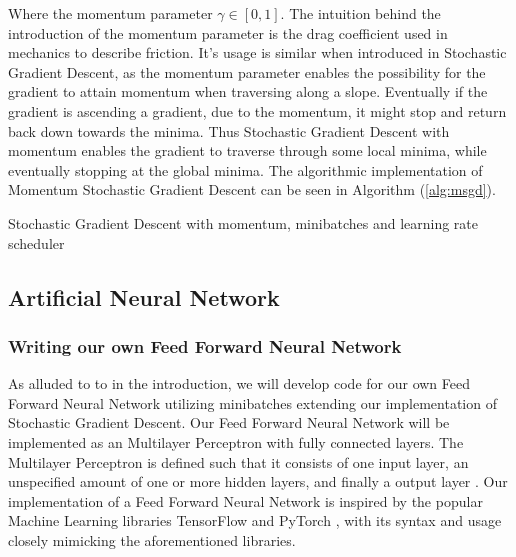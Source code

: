 \documentclass
[twocolumn,
secnumarabic,
nobibnotes,
aps,
prl,
reprint,
groupedaddress,
amsmath,
amssymb
]{revtex4-2}
\begin{document}
Where the momentum parameter $\gamma \in \left[0,1\right]$. The intuition behind the introduction of the momentum parameter is the drag coefficient used in mechanics to describe friction. It's usage is similar when introduced in Stochastic Gradient Descent, as the momentum parameter enables the possibility for the gradient to attain momentum when traversing along a slope. Eventually if the gradient is ascending a gradient, due to the momentum, it might stop and return back down towards the minima. Thus Stochastic Gradient Descent with momentum enables the gradient to traverse through some local minima, while eventually stopping at the global minima. The algorithmic implementation of Momentum Stochastic Gradient Descent can be seen in Algorithm (\ref{alg:msgd}).

\begin{algorithm}
  \Return{$\theta$}
  \caption{\label{alg:msgd}Stochastic Gradient Descent with momentum, minibatches and learning rate scheduler}
\end{algorithm}

\subsection{Artificial Neural Network}
\subsubsection{Writing our own Feed Forward Neural Network}
As alluded to to in the introduction, we will develop code for our own Feed Forward Neural Network utilizing minibatches extending our implementation of Stochastic Gradient Descent. Our Feed Forward Neural Network will be implemented as an Multilayer Perceptron with fully connected layers. The Multilayer Perceptron is defined such that it consists of one input layer, an unspecified amount of one or more hidden layers, and finally a output layer \cite{Geron2019}. Our implementation of a Feed Forward Neural Network is inspired by the popular Machine Learning libraries TensorFlow \cite{tensorflow2015-whitepaper} and PyTorch \cite{paszke2019}, with its syntax and usage closely mimicking the aforementioned libraries.
\end{document}
